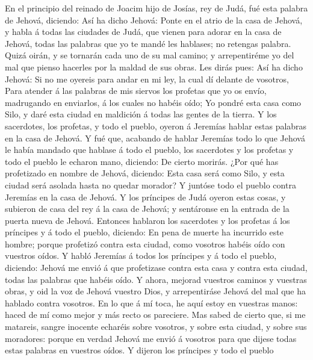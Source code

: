  En el principio del reinado de Joacim hijo de Josías, rey
de Judá, fué esta palabra de Jehová, diciendo:  Así ha
dicho Jehová: Ponte en el atrio de la casa de Jehová, y habla á todas
las ciudades de Judá, que vienen para adorar en la casa de Jehová, todas
las palabras que yo te mandé les hablases; no retengas palabra.
 Quizá oirán, y se tornarán cada uno de su mal camino; y
arrepentiréme yo del mal que pienso hacerles por la maldad de sus obras.
 Les dirás pues: Así ha dicho Jehová: Si no me oyereis
para andar en mi ley, la cual dí delante de vosotros, 
Para atender á las palabras de mis siervos los profetas que yo os envío,
madrugando en enviarlos, á los cuales no habéis oído;  Yo
pondré esta casa como Silo, y daré esta ciudad en maldición á todas las
gentes de la tierra.  Y los sacerdotes, los profetas, y
todo el pueblo, oyeron á Jeremías hablar estas palabras en la casa de
Jehová.  Y fué que, acabando de hablar Jeremías todo lo
que Jehová le había mandado que hablase á todo el pueblo, los sacerdotes
y los profetas y todo el pueblo le echaron mano, diciendo: De cierto
morirás.  ¿Por qué has profetizado en nombre de Jehová,
diciendo: Esta casa será como Silo, y esta ciudad será asolada hasta no
quedar morador? Y juntóse todo el pueblo contra Jeremías en la casa de
Jehová.  Y los príncipes de Judá oyeron estas cosas, y
subieron de casa del rey á la casa de Jehová; y sentáronse en la entrada
de la puerta nueva de Jehová.  Entonces hablaron los
sacerdotes y los profetas á los príncipes y á todo el pueblo, diciendo:
En pena de muerte ha incurrido este hombre; porque profetizó contra esta
ciudad, como vosotros habéis oído con vuestros oídos.  Y
habló Jeremías á todos los príncipes y á todo el pueblo, diciendo:
Jehová me envió á que profetizase contra esta casa y contra esta ciudad,
todas las palabras que habéis oído.  Y ahora, mejorad
vuestros caminos y vuestras obras, y oid la voz de Jehová vuestro Dios,
y arrepentiráse Jehová del mal que ha hablado contra vosotros.
 En lo que á mí toca, he aquí estoy en vuestras manos:
haced de mí como mejor y más recto os pareciere.  Mas
sabed de cierto que, si me matareis, sangre inocente echaréis sobre
vosotros, y sobre esta ciudad, y sobre sus moradores: porque en verdad
Jehová me envió á vosotros para que dijese todas estas palabras en
vuestros oídos.  Y dijeron los príncipes y todo el pueblo
